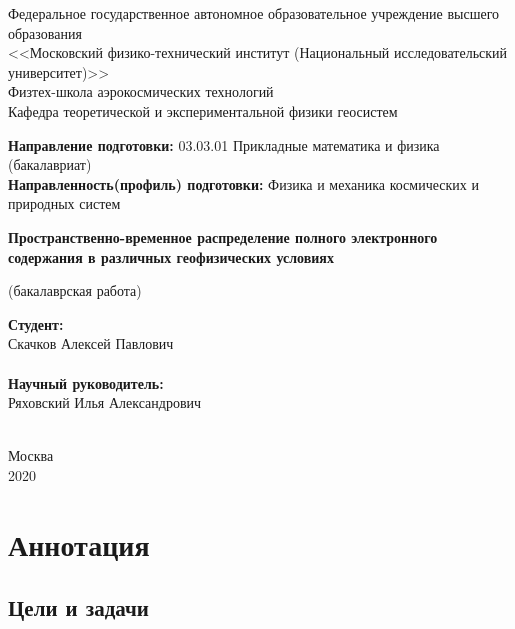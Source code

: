\documentclass[14pt]{article}
\begin{document}
\begin{center}
\small
Федеральное государственное автономное образовательное учреждение высшего образования\\
<<Московский физико-технический институт (Национальный исследовательский университет)>> \\
Физтех-школа аэрокосмических технологий\\
Кафедра теоретической и экспериментальной физики геосистем
\end{center}

\begin{flushleft}
\small
\textbf{Направление подготовки:} 03.03.01 Прикладные математика и физика (бакалавриат)\\
\textbf{Направленность(профиль) подготовки:} Физика и механика космических и природных систем\\
\end{flushleft}

\begin{center}
\LARGE
\textbf{Пространственно-временное распределение полного электронного содержания в различных геофизических условиях}

\small(бакалаврская работа)
\end{center}


\begin{flushright}

\noindent
\textbf{Студент:} \\
Скачков Алексей Павлович\\
\underline{\hspace{3cm}}\\
\textbf{Научный руководитель:}\\
Ряховский Илья Александрович\\
\underline{\hspace{3cm}}\\

\end{flushright}

\begin{center}
\small
Москва\\
2020
\end{center}


\newpage
\section*{Аннотация}
\subsection*{Цели и задачи}
\end{document}
